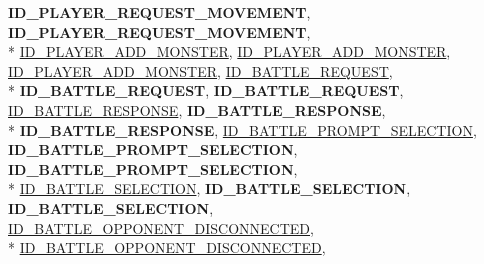 \begin{DoxyCompactItemize}
{\bfseries I\-D\-\_\-\-P\-L\-A\-Y\-E\-R\-\_\-\-R\-E\-Q\-U\-E\-S\-T\-\_\-\-M\-O\-V\-E\-M\-E\-N\-T}, 
{\bfseries I\-D\-\_\-\-P\-L\-A\-Y\-E\-R\-\_\-\-R\-E\-Q\-U\-E\-S\-T\-\_\-\-M\-O\-V\-E\-M\-E\-N\-T}, 
\\*
\hyperlink{namespace_champ_net_plugin_a2ade5cfa7cf6c25ab7236c6b54a57821a942496ffc9e2a24c46c0bfd3f24460f6}{I\-D\-\_\-\-P\-L\-A\-Y\-E\-R\-\_\-\-A\-D\-D\-\_\-\-M\-O\-N\-S\-T\-E\-R}, 
\hyperlink{namespace_champ_net_plugin_a2ade5cfa7cf6c25ab7236c6b54a57821ad42c079bb7459dbaf419eeb2e845f3e2}{I\-D\-\_\-\-P\-L\-A\-Y\-E\-R\-\_\-\-A\-D\-D\-\_\-\-M\-O\-N\-S\-T\-E\-R}, 
\hyperlink{namespace_champ_net_plugin_a2ade5cfa7cf6c25ab7236c6b54a57821ad42c079bb7459dbaf419eeb2e845f3e2}{I\-D\-\_\-\-P\-L\-A\-Y\-E\-R\-\_\-\-A\-D\-D\-\_\-\-M\-O\-N\-S\-T\-E\-R}, 
\hyperlink{namespace_champ_net_plugin_a2ade5cfa7cf6c25ab7236c6b54a57821a1099c58a5b9ad43616e67c5865ce539a}{I\-D\-\_\-\-B\-A\-T\-T\-L\-E\-\_\-\-R\-E\-Q\-U\-E\-S\-T}, 
\\*
{\bfseries I\-D\-\_\-\-B\-A\-T\-T\-L\-E\-\_\-\-R\-E\-Q\-U\-E\-S\-T}, 
{\bfseries I\-D\-\_\-\-B\-A\-T\-T\-L\-E\-\_\-\-R\-E\-Q\-U\-E\-S\-T}, 
\hyperlink{namespace_champ_net_plugin_a2ade5cfa7cf6c25ab7236c6b54a57821a4d61a30352b41b284f20eeb6d46d0b18}{I\-D\-\_\-\-B\-A\-T\-T\-L\-E\-\_\-\-R\-E\-S\-P\-O\-N\-S\-E}, 
{\bfseries I\-D\-\_\-\-B\-A\-T\-T\-L\-E\-\_\-\-R\-E\-S\-P\-O\-N\-S\-E}, 
\\*
{\bfseries I\-D\-\_\-\-B\-A\-T\-T\-L\-E\-\_\-\-R\-E\-S\-P\-O\-N\-S\-E}, 
\hyperlink{namespace_champ_net_plugin_a2ade5cfa7cf6c25ab7236c6b54a57821a1ce06c939b64517c251a1cc36168837f}{I\-D\-\_\-\-B\-A\-T\-T\-L\-E\-\_\-\-P\-R\-O\-M\-P\-T\-\_\-\-S\-E\-L\-E\-C\-T\-I\-O\-N}, 
{\bfseries I\-D\-\_\-\-B\-A\-T\-T\-L\-E\-\_\-\-P\-R\-O\-M\-P\-T\-\_\-\-S\-E\-L\-E\-C\-T\-I\-O\-N}, 
{\bfseries I\-D\-\_\-\-B\-A\-T\-T\-L\-E\-\_\-\-P\-R\-O\-M\-P\-T\-\_\-\-S\-E\-L\-E\-C\-T\-I\-O\-N}, 
\\*
\hyperlink{namespace_champ_net_plugin_a2ade5cfa7cf6c25ab7236c6b54a57821aaf35bd9b65c9b7d548147fbd85717bf9}{I\-D\-\_\-\-B\-A\-T\-T\-L\-E\-\_\-\-S\-E\-L\-E\-C\-T\-I\-O\-N}, 
{\bfseries I\-D\-\_\-\-B\-A\-T\-T\-L\-E\-\_\-\-S\-E\-L\-E\-C\-T\-I\-O\-N}, 
{\bfseries I\-D\-\_\-\-B\-A\-T\-T\-L\-E\-\_\-\-S\-E\-L\-E\-C\-T\-I\-O\-N}, 
\hyperlink{namespace_champ_net_plugin_a2ade5cfa7cf6c25ab7236c6b54a57821a6bf2d8b7c920b398839dd015883be97d}{I\-D\-\_\-\-B\-A\-T\-T\-L\-E\-\_\-\-O\-P\-P\-O\-N\-E\-N\-T\-\_\-\-D\-I\-S\-C\-O\-N\-N\-E\-C\-T\-E\-D}, 
\\*
\hyperlink{namespace_champ_net_plugin_a2ade5cfa7cf6c25ab7236c6b54a57821addd7d4ef5710787934d893be10785f0d}{I\-D\-\_\-\-B\-A\-T\-T\-L\-E\-\_\-\-O\-P\-P\-O\-N\-E\-N\-T\-\_\-\-D\-I\-S\-C\-O\-N\-N\-E\-C\-T\-E\-D}, 

\end{DoxyCompactItemize}
